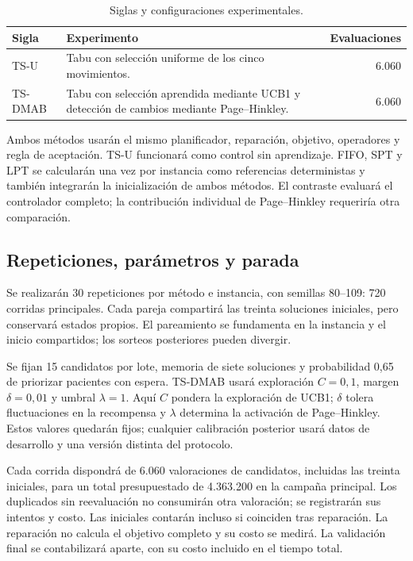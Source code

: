 \begin{table}[ht]
 \centering
 \caption{Siglas y configuraciones experimentales.}
 \label{tab:metodos}
 \begin{tabular}{@{}lp{}r@{}}
  \toprule
  Sigla & Experimento & Evaluaciones\\
  \midrule
  TS-U & Tabu con selección uniforme de los cinco movimientos. & 6.060\\
  TS-DMAB & Tabu con selección aprendida mediante UCB1 y detección
  de cambios mediante Page--Hinkley. & 6.060\\
  \bottomrule
 \end{tabular}
\end{table}
Ambos métodos usarán el mismo planificador, reparación, objetivo, operadores
y regla de aceptación. TS-U funcionará como control sin aprendizaje.
FIFO, SPT y LPT se calcularán una vez por instancia como referencias
deterministas y también integrarán la inicialización de ambos métodos.
El contraste evaluará el controlador completo; la contribución individual
de Page--Hinkley requeriría otra comparación.

\clearpage
\subsection{Repeticiones, parámetros y parada}
Se realizarán 30 repeticiones por método e instancia, con semillas 80--109:
720 corridas principales. Cada pareja compartirá las treinta soluciones
iniciales, pero conservará estados propios. El pareamiento se fundamenta
en la instancia y el inicio compartidos; los sorteos posteriores pueden divergir.

Se fijan 15 candidatos por lote, memoria de siete soluciones y probabilidad
0,65 de priorizar pacientes con espera. TS-DMAB usará exploración
$C=0{,}1$, margen $\delta=0{,}01$ y umbral $\lambda=1$.
Aquí $C$ pondera la exploración de UCB1; $\delta$ tolera fluctuaciones
en la recompensa y $\lambda$ determina la activación de Page--Hinkley.
Estos valores quedarán fijos; cualquier calibración posterior usará
datos de desarrollo y una versión distinta del protocolo.

Cada corrida dispondrá de 6.060 valoraciones de candidatos, incluidas
las treinta iniciales, para un total presupuestado de 4.363.200 en la
campaña principal. Los duplicados sin reevaluación no consumirán otra
valoración; se registrarán sus intentos y costo. Las iniciales contarán
incluso si coinciden tras reparación. La reparación no calcula el objetivo
completo y su costo se medirá. La validación final se contabilizará aparte,
con su costo incluido en el tiempo total.

